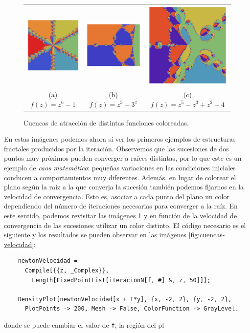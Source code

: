 \begin{figure}[ht]
    \centering
    \begin{tabular}{ccc}
      \includegraphics[scale=0.33]{img/cuencas-color-1.png} &   \includegraphics[scale=0.31]{img/cuencas-color-2.png} &   \includegraphics[scale=0.33]{img/cuencas-color-3.png} \\
    (a) $f(z)=z^6-1$ & (b) $f(z)=z^3-3^z$ & (c) $f(z)=z^5-z^3+z^2-4$ \\[6pt]
    \end{tabular}
    \caption{Cuencas de atracción de distintas funciones coloreadas.}
    \label{fig:cuencas-raiz}
\end{figure}

En estas imágenes podemos ahora sí ver los primeros ejemplos de estructuras fractales producidos por la iteración. Observemos que las sucesiones de dos puntos muy próximos pueden converger a raíces distintas, por lo que este es un ejemplo de \textit{caos matemático}: pequeñas variaciones en las condiciones iniciales conducen a comportamientos muy diferentes. Además, en lugar de colorear el plano según la raíz a la que converja la sucesión también podemos fijarnos en la velocidad de convergencia. Esto es, asociar a cada punto del plano un color dependiendo del número de iteraciones necesarias para converger a la raíz. En este sentido, podemos revisitar las imágenes \ref{fig:cuencas-raiz} y en función de la velocidad de convergencia de las sucesiones utilizar un color distinto. El código necesario es el siguiente y los resultados se pueden observar en las imágenes \ref{fig:cuencas-velocidad}:

\begin{verbatim}
    newtonVelocidad = 
      Compile[{{z, _Complex}}, 
        Length[FixedPointList[iteracionN[f, #] &, z, 50]]];
    
    DensityPlot[newtonVelocidad[x + I*y], {x, -2, 2}, {y, -2, 2}, 
      PlotPoints -> 200, Mesh -> False, ColorFunction -> GrayLevel]
\end{verbatim}

donde se puede cambiar el valor de \verb|f|, la región del pl